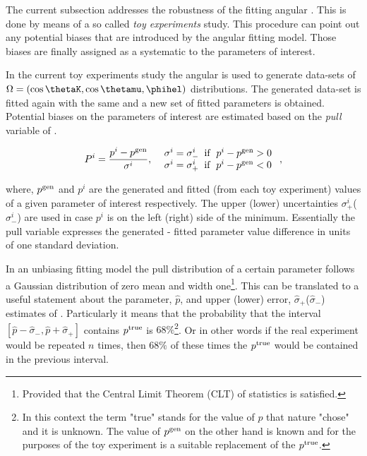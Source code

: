 The current subsection addresses the robustness of the fitting angular \pdf.
This is done by means of a so called {\it toy experiments} study. This procedure
can point out any potential biases that are introduced by the angular fitting model.
Those biases are finally assigned as a systematic to the parameters of interest.

In the current toy experiments study the angular \pdf is used to generate data-sets of $\Omega = (\cos\thetaK,\cos\thetamu,\phihel)$
distributions. The generated data-set is fitted again with the same \pdf and a new set of fitted parameters is obtained. Potential
biases on the parameters of interest are estimated based on the {\it pull} variable of .

\begin{equation}
P^i = \frac{p^i - p^{\rm gen}}{ \sigma^i },\;\;\left.
  \begin{array}{ll}
    \sigma^i = \sigma^i_- \;\;{\rm if}\;\; p^i - p^{\rm gen} > 0   \\
    \sigma^i = \sigma^i_+ \;\;{\rm if}\;\; p^i - p^{\rm gen} < 0
  \end{array} \right. ,
\label{pull_def}
\end{equation}

\noindent where, $p^{\rm gen}$ and $p^i$ are the generated and fitted (from each toy experiment) values of a given parameter of interest
respectively. The upper (lower) uncertainties $\sigma^i_+$($\sigma^i_-$) are used in case $p^i$ is on the left (right) side of the minimum.
Essentially the pull variable expresses the generated - fitted parameter value difference in units of one standard deviation.

In an unbiasing fitting model the pull distribution of a certain parameter follows a Gaussian distribution of zero mean and width
one\footnote{Provided that the Central Limit Theorem (CLT) of statistics is satisfied.}.
This can be translated to a useful statement about the parameter, $\hat{p}$, and upper (lower) error, $\hat{\sigma}_+$($\hat{\sigma}_-$)
estimates of . Particularly it means that the probability that the interval
$[\hat{p}-\hat{\sigma}_-,\hat{p}+\hat{\sigma}_+]$ contains $p^{\rm true}$ is $68\%$\footnote{In this context the term "true" stands for the
value of $p$ that nature "chose" and it is unknown. The value of $p^{\rm gen}$ on the other hand is known and for the purposes of
the toy experiment is a suitable replacement of the $p^{\rm true}$.}. Or in other words if the real experiment would be repeated
$n$ times, then $68\%$ of these times the $p^{\rm true}$ would be contained in the previous interval.

